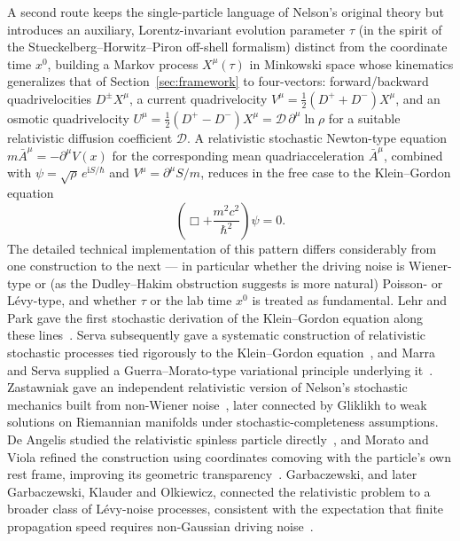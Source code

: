 \documentclass[11pt]{article}
\newcommand{\D}{\mathcal{D}}
\newcommand{\ii}{\mathrm{i}}
\begin{document}
A second route keeps the single-particle language of Nelson's original
theory but introduces an auxiliary, Lorentz-invariant evolution parameter
$\tau$ (in the spirit of the Stueckelberg--Horwitz--Piron off-shell
formalism) distinct from the coordinate time $x^0$, building a Markov
process $X^\mu(\tau)$ in Minkowski space whose kinematics generalizes that
of Section~\ref{sec:framework} to four-vectors: forward/backward
quadrivelocities $D^{\pm}X^\mu$, a current quadrivelocity 
$V^\mu = \tfrac12(D^++D^-)X^\mu$, and an osmotic quadrivelocity 
$U^\mu = \tfrac12(D^+-D^-)X^\mu = \D\,\partial^\mu\ln\rho$ 
for a suitable relativistic diffusion coefficient $\D$. A relativistic
stochastic Newton-type equation $m\bar A^\mu = -\partial^\mu V(x)$ 
for the corresponding mean quadriacceleration $\bar A^\mu$, 
combined with $\psi=\sqrt\rho\,e^{\ii S/\hbar}$ and 
$V^\mu = \partial^\mu S/m$, reduces in the free case to the Klein--Gordon
equation
\begin{equation}
\left(\Box + \frac{m^2c^2}{\hbar^2}\right)\psi = 0 .
\end{equation}
The detailed technical implementation of this pattern differs considerably
from one construction to the next --- in particular whether the driving
noise is Wiener-type or (as the Dudley--Hakim obstruction suggests is more
natural) Poisson- or L\'evy-type, and whether $\tau$ or the lab time $x^0$
is treated as fundamental. Lehr and Park gave the first stochastic
derivation of the Klein--Gordon equation along these
lines~\cite{lehrpark77}. Serva subsequently gave a systematic construction
of relativistic stochastic processes tied rigorously to the Klein--Gordon
equation~\cite{serva88}, and Marra and Serva supplied a Guerra--Morato-type
variational principle underlying it~\cite{marraserva90}. Zastawniak gave an
independent relativistic version of Nelson's stochastic mechanics built
from non-Wiener noise~\cite{zastawniak90}, later connected by Gliklikh to
weak solutions on Riemannian manifolds under stochastic-completeness
assumptions. De Angelis studied the relativistic spinless particle
directly~\cite{deangelis90,deangelisserva90}, and Morato and Viola refined
the construction using coordinates comoving with the particle's own rest
frame, improving its geometric transparency~\cite{moratoviola95}.
Garbaczewski, and later Garbaczewski, Klauder and Olkiewicz, connected the
relativistic problem to a broader class of L\'evy-noise processes,
consistent with the expectation that finite propagation speed requires 
non-Gaussian driving noise~\cite{garbaczewski92,garbaczewskiklauder95}.
\end{document}

